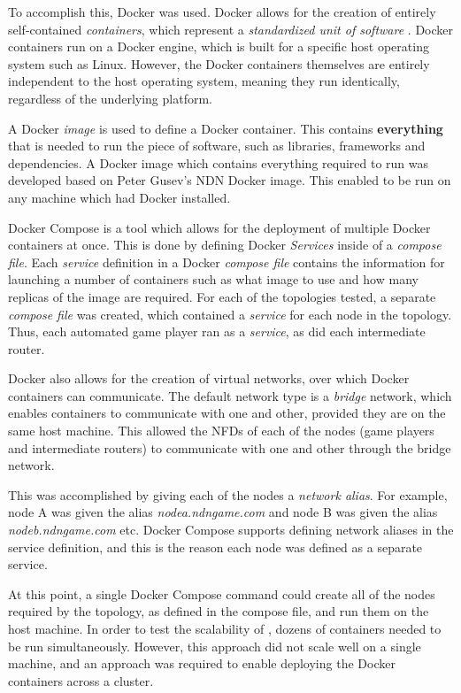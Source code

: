 To accomplish this, Docker was used. Docker allows for the creation of entirely self-contained \textit{containers}, which represent a \textit{standardized unit of software} \cite{docker}. Docker containers run on a Docker engine, which is built for a specific host operating system such as Linux. However, the Docker containers themselves are entirely independent to the host operating system, meaning they run identically, regardless of the underlying platform.

A Docker \textit{image} is used to define a Docker container. This contains \textbf{everything} that is needed to run the piece of software, such as libraries, frameworks and dependencies. A Docker image which contains everything required to run \game{} was developed based on Peter Gusev's \cite{docker-ndn} NDN Docker image. This enabled \game{} to be run on any machine which had Docker installed.

Docker Compose \cite{docker-compose} is a tool which allows for the deployment of multiple Docker containers at once. This is done by defining Docker \textit{Services} inside of a \textit{compose file}. Each \textit{service} definition in a Docker \textit{compose file} contains the information for launching a number of containers such as what image to use and how many replicas of the image are required. For each of the topologies tested, a separate \textit{compose file} was created, which contained a \textit{service} for each node in the topology. Thus, each automated game player ran as a \textit{service}, as did each intermediate router.

Docker also allows for the creation of virtual networks, over which Docker containers can communicate. The default network type is a \textit{bridge} network, which enables containers to communicate with one and other, provided they are on the same host machine. This allowed the NFDs of each of the nodes (game players and intermediate routers) to communicate with one and other through the bridge network. 

This was accomplished by giving each of the nodes a \textit{network alias}. For example, node A was given the alias \textit{nodea.ndngame.com} and node B was given the alias \textit{nodeb.ndngame.com} etc. Docker Compose supports defining network aliases in the service definition, and this is the reason each node was defined as a separate service.

At this point, a single Docker Compose command could create all of the \game{} nodes required by the topology, as defined in the compose file, and run them on the host machine. In order to test the scalability of \game{}, dozens of containers needed to be run simultaneously. However, this approach did not scale well on a single machine, and an approach was required to enable deploying the Docker containers across a cluster.

